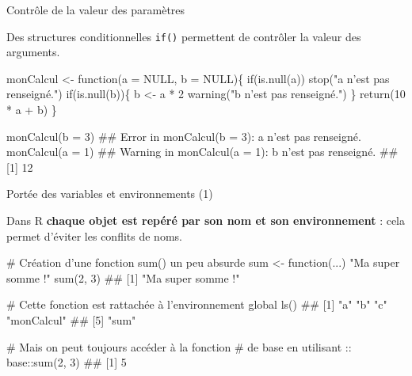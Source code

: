 \documentclass[12pt,handout,ignorenonframetext,]{beamer}
\newenvironment{Shaded}{}{}
\newcommand{\KeywordTok}[1]{\textcolor[rgb]{0.00,0.00,1.00}{{#1}}}
\newcommand{\DataTypeTok}[1]{{#1}}
\newcommand{\DecValTok}[1]{{#1}}
\newcommand{\StringTok}[1]{\textcolor[rgb]{0.00,0.50,0.50}{{#1}}}
\newcommand{\CommentTok}[1]{\textcolor[rgb]{0.00,0.50,0.00}{{#1}}}
\newcommand{\OtherTok}[1]{\textcolor[rgb]{1.00,0.25,0.00}{{#1}}}
\newcommand{\NormalTok}[1]{{#1}}
\renewenvironment{Shaded}{\begin{snugshade}}{\end{snugshade}}
\begin{document}
\begin{frame}[fragile]{Contrôle de la valeur des paramètres}

Des structures conditionnelles \texttt{if()} permettent de contrôler la
valeur des arguments.

\pause \footnotesize

\begin{Shaded}
\begin{Highlighting}[]
\NormalTok{monCalcul <-}\StringTok{ }\NormalTok{function(}\DataTypeTok{a =} \OtherTok{NULL}\NormalTok{, }\DataTypeTok{b =} \OtherTok{NULL}\NormalTok{)\{}
  \NormalTok{if(}\KeywordTok{is.null}\NormalTok{(a)) }\KeywordTok{stop}\NormalTok{(}\StringTok{"a n'est pas renseigné."}\NormalTok{)}
  \NormalTok{if(}\KeywordTok{is.null}\NormalTok{(b))\{}
    \NormalTok{b <-}\StringTok{ }\NormalTok{a *}\StringTok{ }\DecValTok{2}
    \KeywordTok{warning}\NormalTok{(}\StringTok{"b n'est pas renseigné."}\NormalTok{)}
  \NormalTok{\}}
  \KeywordTok{return}\NormalTok{(}\DecValTok{10} \NormalTok{*}\StringTok{ }\NormalTok{a +}\StringTok{ }\NormalTok{b)}
\NormalTok{\}}

\KeywordTok{monCalcul}\NormalTok{(}\DataTypeTok{b =} \DecValTok{3}\NormalTok{)}
  \NormalTok{## Error in monCalcul(b = 3): a n'est pas renseigné.}
\KeywordTok{monCalcul}\NormalTok{(}\DataTypeTok{a =} \DecValTok{1}\NormalTok{)}
  \NormalTok{## Warning in monCalcul(a = 1): b n'est pas renseigné.}
  \NormalTok{## [1] 12}
\end{Highlighting}
\end{Shaded}

\end{frame}

\begin{frame}[fragile]{\large Portée des variables et environnements
(1)}

Dans R \textbf{chaque objet est repéré par son nom et son environnement}
: cela permet d'éviter les conflits de noms.

\pause \footnotesize

\begin{Shaded}
\begin{Highlighting}[]
\CommentTok{# Création d'une fonction sum() un peu absurde}
\NormalTok{sum <-}\StringTok{ }\NormalTok{function(...) }\StringTok{"Ma super somme !"}
\KeywordTok{sum}\NormalTok{(}\DecValTok{2}\NormalTok{, }\DecValTok{3}\NormalTok{)}
  \NormalTok{## [1] "Ma super somme !"}

\CommentTok{# Cette fonction est rattachée à l'environnement global}
\KeywordTok{ls}\NormalTok{()}
  \NormalTok{## [1] "a"         "b"         "c"         "monCalcul"}
  \NormalTok{## [5] "sum"}

\CommentTok{# Mais on peut toujours accéder à la fonction }
\CommentTok{# de base en utilisant ::}
\NormalTok{base::}\KeywordTok{sum}\NormalTok{(}\DecValTok{2}\NormalTok{, }\DecValTok{3}\NormalTok{)}
  \NormalTok{## [1] 5}
\end{Highlighting}
\end{Shaded}

\end{frame}
\end{document}
